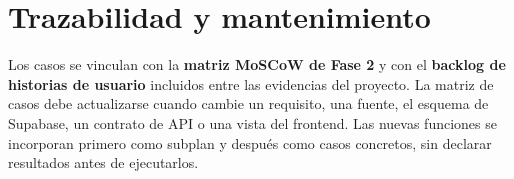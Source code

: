 \documentclass[11pt,a4paper]{article}
\begin{document}
\section{Trazabilidad y mantenimiento}

Los casos se vinculan con la \textbf{matriz MoSCoW de Fase 2} y con el
\textbf{backlog de historias de usuario} incluidos entre las evidencias del proyecto.
La matriz de casos debe
actualizarse cuando cambie un requisito, una fuente, el esquema de Supabase, un contrato de
API o una vista del frontend. Las nuevas funciones se incorporan primero como subplan y
después como casos concretos, sin declarar resultados antes de ejecutarlos.
\end{document}
